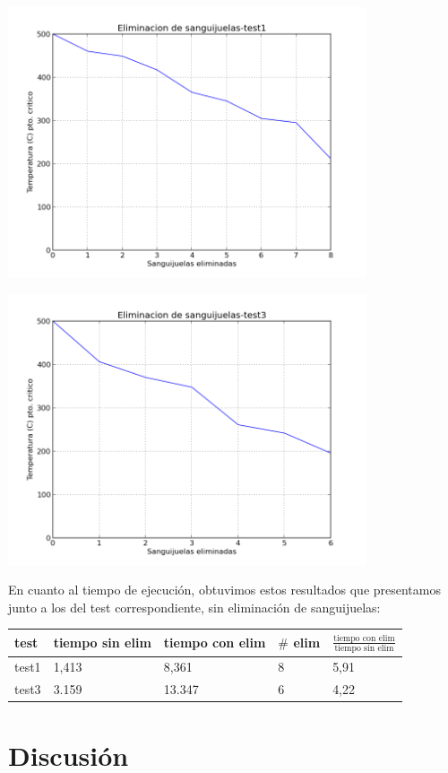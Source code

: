 \documentclass[a4paper]{article}
\begin{document}
\includegraphics[width=300pt]{img/elim1.png} 

\includegraphics[width=300pt]{img/elim3.png} 

En cuanto al tiempo de ejecución, obtuvimos estos resultados que presentamos junto a los del test correspondiente, sin eliminación de sanguijuelas: \smallskip \newline

\begin{tabular}{ l |l l l l}
  test & tiempo sin elim & tiempo con elim & $\#$ elim & $\frac{\text{tiempo con elim}}{\text{tiempo sin elim}}$\\
  \hline
  test1 & 1,413 & 8,361 & 8 & 5,91\\
  test3 & 3.159 & 13.347 & 6 & 4,22
\end{tabular} 


\newpage

\section{Discusi\'{o}n}
\label{sec:discusion}
\end{document}
